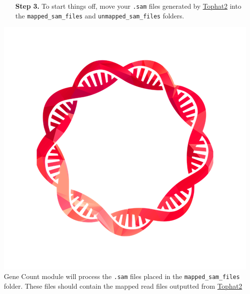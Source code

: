 \documentclass[11pt,fleqn]{book} %
\newcommand{\GeneCount}{{\color{Red} Gene Count }}
\begin{document}
\begin{itemize}
    \item[\textbf{Step 3.}] To start things off, move your \texttt{.sam} files generated by \underline{Tophat2} into the \texttt{mapped\_sam\_files} and \texttt{unmapped\_sam\_files} folders.
\end{itemize}

\includegraphics[scale=0.3]{Pictures/gene_count.png} \GeneCount module will process the \texttt{.sam} files placed in the \texttt{mapped\_sam\_files} folder. These files should contain the mapped read files outputted from \underline{Tophat2}\\
\end{document}
